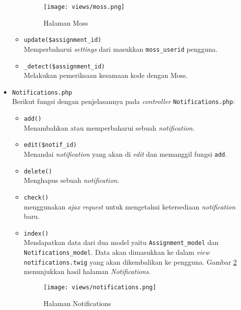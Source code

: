 \begin{itemize}
\begin{itemize}
		            \begin{figure}[H]
			            \centering
			            \texttt{[image: views/moss.png]}
			            \caption{Halaman Moss}
			            \label{fig:3:1:1:moss}
		            \end{figure}
		      \item \verb|update($assignment_id)| \\
		            Memperbaharui \textit{settings} dari masukkan \verb|moss_userid| pengguna.
		      \item \verb|_detect($assignment_id)| \\
		            Melakukan pemeriksaan kesamaan kode dengan Moss.

	      \end{itemize}

	\item \verb|Notifications.php| \\
	      Berikut fungsi dengan penjelasannya pada \textit{controller} \verb|Notifications.php|:

	      \begin{itemize}
		      \item \verb|add()| \\
		            Menambahkan atau memperbaharui sebuah \textit{notification}.
		      \item \verb|edit($notif_id)| \\
		            Menandai \textit{notification} yang akan di \textit{edit} dan memanggil fungsi \verb|add|.
		      \item \verb|delete()| \\
		            Menghapus sebuah \textit{notification}.
		      \item \verb|check()| \\
		            menggunakan \textit{ajax request} untuk mengetahui ketersediaan \textit{notification} baru.
		      \item \verb|index()| \\
		            Mendapatkan data dari dua model yaitu \verb|Assignment_model| dan \verb|Notifications_model|. Data akan dimasukkan ke dalam \textit{view} \verb|notifications.twig| yang akan dikembalikan ke pengguna. Gambar \ref{fig:3:1:1:notif} menunjukkan hasil halaman \textit{Notifications}.

		            \begin{figure}[H]
			            \centering
			            \texttt{[image: views/notifications.png]}
			            \caption{Halaman Notifications}
			            \label{fig:3:1:1:notif}
		            \end{figure}


\end{itemize}
\end{itemize}
